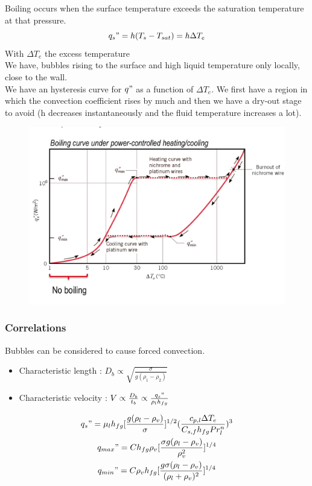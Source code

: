 \documentclass[../main.tex]{subfiles}
\begin{document}
Boiling occurs when the surface temperature exceeds the saturation temperature at that pressure.\\
\begin{equation}
    q_s" = h(T_s-T_{sat}) = h\Delta T_e
\end{equation}
With $\Delta T_e$ the excess temperature\\

We have, bubbles rising to the surface and high liquid temperature only locally, close to the wall.\\


We have an hysteresis curve for $q"$ as a function of $\Delta T_e$. We first have a region in which the convection coefficient rises by much and then we have a dry-out stage to avoid (h decreases instantaneously and the fluid temperature increases a lot).\\

\begin{figure}[hbt!]
    \centering
    \includegraphics[width=.6\textwidth]{IMAGES/elec/PNG image.png}
\end{figure}

\subsubsection{Correlations}
Bubbles can be considered to cause forced convection. \\
\begin{itemize}
    \item Characteristic length : $D_b \propto \sqrt{\frac{\sigma}{g(\rho_1-\rho_2)}}$\\
    \item Characteristic velocity : $V \propto \frac{D_b}{t_b} \propto \frac{q_s"}{\rho_l h_{fg}}$\\
\end{itemize}

\begin{equation} \begin{gathered}
q_s" = \mu_l h_{fg} [\frac{g(\rho_l - \rho_v)}{\sigma}]^{1/2} (\frac{c_{p,l} \Delta T_e}{C_{s,f} h_{fg} Pr_l^n})^3\\
q_{max}"= Ch_{fg} \rho_v [\frac{\sigma g(\rho_l - \rho_v)}{\rho_v^2}]^{1/4}\\
q_{min}" = C \rho_v h_{fg} [\frac{g \sigma (\rho_l - \rho_v)}{(\rho_l + \rho_v)^2}]^{1/4}\\
\end{gathered}
\end{equation}
\end{document}
